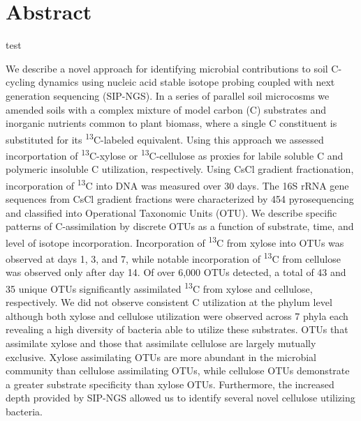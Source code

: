 \section{Abstract} 

test

We describe a novel approach for identifying microbial contributions to soil C-cycling dynamics using nucleic acid stable isotope probing coupled with next generation sequencing (SIP-NGS). In a series of parallel soil microcosms we amended soils with a complex mixture of model carbon (C) substrates and inorganic nutrients common to plant biomass, where a single C constituent is substituted for its \textsuperscript{13}C-labeled equivalent. Using this approach we assessed incorportation of \textsuperscript{13}C-xylose or \textsuperscript{13}C-cellulose as proxies for labile soluble C and polymeric insoluble C utilization, respectively. Using CsCl gradient fractionation, incorporation of \textsuperscript{13}C into DNA was measured over 30 days. The 16S rRNA gene sequences from CsCl gradient fractions were characterized by 454 pyrosequencing and classified into Operational Taxonomic Units (OTU). We describe specific patterns of C-assimilation by discrete OTUs as a function of substrate, time, and level of isotope incorporation. Incorporation of \textsuperscript{13}C from xylose into OTUs was observed at days 1, 3, and 7, while notable incorporation of \textsuperscript{13}C from cellulose was observed only after day 14. Of over 6,000 OTUs detected, a total of 43 and 35 unique OTUs significantly assimilated \textsuperscript{13}C from xylose and cellulose, respectively. We did not observe consistent C utilization at the phylum level although both xylose and cellulose utilization were observed across 7 phyla each revealing a high diversity of bacteria able to utilize these substrates. OTUs that assimilate xylose and those that assimilate cellulose are largely mutually exclusive. Xylose assimilating OTUs are more abundant in the microbial community than cellulose assimilating OTUs, while cellulose OTUs demonstrate a greater substrate specificity than xylose OTUs. Furthermore, the increased depth provided by SIP-NGS allowed us to identify several novel cellulose utilizing bacteria.        

